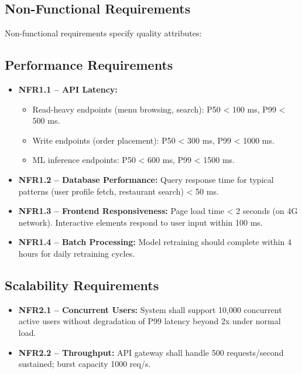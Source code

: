 \documentclass[12pt,a4paper]{report}
\begin{document}
\begin{itemize}
\section{Non-Functional Requirements}

Non-functional requirements specify quality attributes:

\subsection{Performance Requirements}

\begin{itemize}
    \item \textbf{NFR1.1 -- API Latency:} 
    \begin{itemize}
        \item Read-heavy endpoints (menu browsing, search): P50 < 100 ms, P99 < 500 ms.
        \item Write endpoints (order placement): P50 < 300 ms, P99 < 1000 ms.
        \item ML inference endpoints: P50 < 600 ms, P99 < 1500 ms.
    \end{itemize}
    
    \item \textbf{NFR1.2 -- Database Performance:} Query response time for typical patterns (user profile fetch, restaurant search) < 50 ms.
    
    \item \textbf{NFR1.3 -- Frontend Responsiveness:} Page load time < 2 seconds (on 4G network). Interactive elements respond to user input within 100 ms.
    
    \item \textbf{NFR1.4 -- Batch Processing:} Model retraining should complete within 4 hours for daily retraining cycles.
\end{itemize}

\subsection{Scalability Requirements}

\begin{itemize}
    \item \textbf{NFR2.1 -- Concurrent Users:} System shall support 10,000 concurrent active users without degradation of P99 latency beyond 2x under normal load.
    
    \item \textbf{NFR2.2 -- Throughput:} API gateway shall handle 500 requests/second sustained; burst capacity 1000 req/s.
    

\end{itemize}
\end{itemize}
\end{document}

